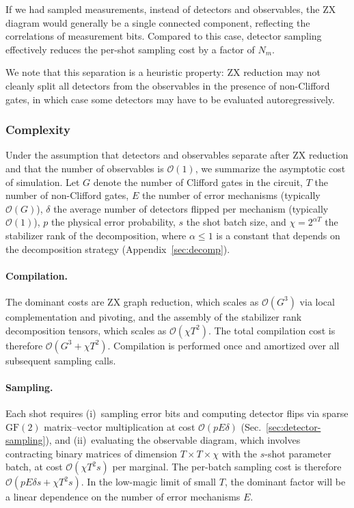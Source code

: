 \documentclass[
  a4paper,
  onecolumn,
  11pt,
  allowtoday
]{quantumarticle}
\newcommand{\bigO}[1]{\mathcal{O}(#1)}
\newcommand{\FF}{\mathrm{GF}(2)}
\newcommand{\ngates}{G}          %
\newcommand{\nmagic}{T}          %
\newcommand{\nerr}{E}            %
\newcommand{\navgflip}{\delta}   %
\newcommand{\perr}{p}            %
\newcommand{\batchsize}{s}       %
\newcommand{\stabrank}{\chi}     %
\newcommand{\decomprate}{\alpha} %
\begin{document}
If we had sampled measurements, instead of detectors and observables, the ZX diagram would generally be a single connected component, reflecting the correlations of measurement bits. Compared to this case, detector sampling effectively reduces the per-shot sampling cost by a factor of $N_m$.

We note that this separation is a heuristic property: ZX reduction may not cleanly split all detectors from the observables in the presence of non-Clifford gates, in which case some detectors may have to be evaluated autoregressively.

\subsubsection{Complexity}

Under the assumption that detectors and observables separate after ZX reduction and that the number of observables is $\bigO{1}$, we summarize the asymptotic cost of simulation. Let $\ngates$ denote the number of Clifford gates in the circuit, $\nmagic$ the number of non-Clifford gates, $\nerr$ the number of error mechanisms (typically $\bigO{\ngates}$), $\navgflip$ the average number of detectors flipped per mechanism (typically $\bigO{1}$), $\perr$ the physical error probability, $\batchsize$ the shot batch size, and $\stabrank = 2^{\decomprate \nmagic}$ the stabilizer rank of the decomposition, where $\decomprate \le 1$ is a constant that depends on the decomposition strategy (Appendix~\ref{sec:decomp}).

\paragraph{Compilation.} The dominant costs are ZX graph reduction, which scales as $\bigO{\ngates^3}$ via local complementation and pivoting, and the assembly of the stabilizer rank decomposition tensors, which scales as $\bigO{\stabrank \nmagic^2}$. The total compilation cost is therefore $\bigO{\ngates^3 + \stabrank \nmagic^2}$. Compilation is performed once and amortized over all subsequent sampling calls.

\paragraph{Sampling.} Each shot requires (i)~sampling error bits and computing detector flips via sparse $\FF$ matrix--vector multiplication at cost $\bigO{\perr \nerr \navgflip}$ (Sec.~\ref{sec:detector-sampling}), and (ii)~evaluating the observable diagram, which involves contracting binary matrices of dimension $\nmagic \times \nmagic \times \stabrank$ with the $\batchsize$-shot parameter batch, at cost $\bigO{\stabrank \nmagic^2 \batchsize}$ per marginal. The per-batch sampling cost is therefore $\bigO{\perr \nerr \navgflip \batchsize + \stabrank \nmagic^2 \batchsize}$. In the low-magic limit of small $\nmagic$, the dominant factor will be a linear dependence on the number of error mechanisms $\nerr$.
\end{document}
